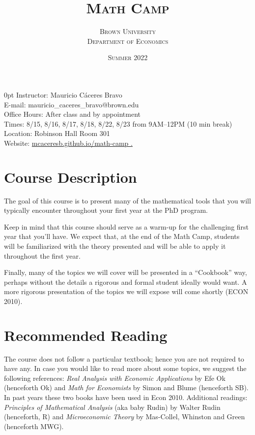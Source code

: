 \documentclass[11pt]{article}
\title{\bfseries\scshape Math Camp}
\author{\scshape Brown University \\ \scshape Department of Economics}
\date{\scshape Summer 2022}
\renewcommand{\displayoptions}{\maketitle\pagenumbering{arabic}}
\begin{document}
\displayoptions

{
  \bfseries
  \begin{adjustwidth}{\parindent}{0pt}
    Instructor: Mauricio C\'aceres Bravo \\
    E-mail: mauricio\_caceres\_bravo@brown.edu \\
    Office Hours: After class and by appointment \\[12pt]
    Times: 8/15, 8/16, 8/17, 8/18, 8/22, 8/23 from 9AM--12PM (10 min break) \\
    Location: Robinson Hall Room 301 \\
    Website: \href{https://mcaceresb.github.io/tablefill}{mcaceresb.github.io/math-camp \ExternalLink.}
  \end{adjustwidth}
  \vspace{12pt}
}

\section{Course Description}
\label{sec:course_description}

The goal of this course is to present many of the mathematical tools that you will typically encounter throughout your first year at the PhD program.

Keep in mind that this course should serve as a warm-up for the challenging first year that you’ll have. We expect that, at the end of the Math Camp, students will be familiarized with the theory presented and will be able to apply it throughout the first year.

Finally, many of the topics we will cover will be presented in a ``Cookbook'' way, perhaps without the details a rigorous and formal student ideally would want. A more rigorous presentation of the topics we will expose will come shortly (ECON 2010).

\section{Recommended Reading}
\label{sec:recommended_reading}

The course does not follow a particular textbook; hence you are not required to have any. In case you would like to read more about some topics, we suggest the following references: \textit{Real Analysis with Economic Applications} by Efe Ok (henceforth Ok) and \textit{Math for Economists} by Simon and Blume (henceforth SB). In past years these two books have been used in Econ 2010. Additional readings: \textit{Principles of Mathematical Analysis} (aka baby Rudin) by Walter Rudin (henceforth, R) and \textit{Microeconomic Theory} by Mas-Collel, Whinston and Green (henceforth MWG).
\end{document}
